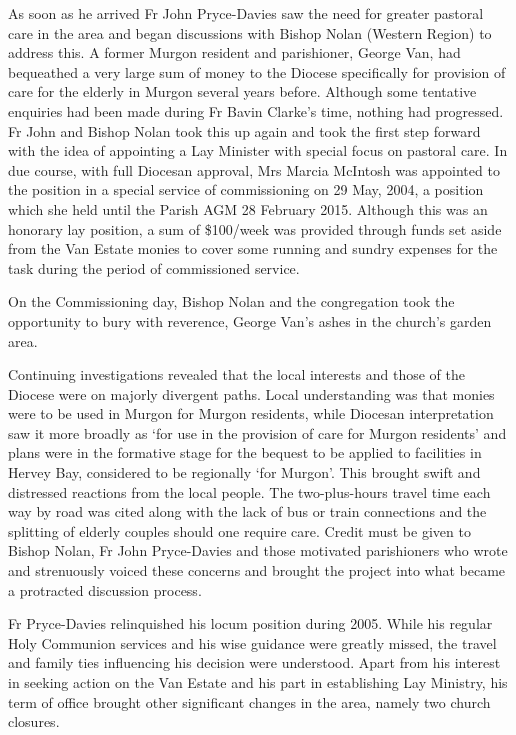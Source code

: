 As soon as he arrived Fr John Pryce-Davies saw the need for greater pastoral care in the area and began discussions with Bishop Nolan (Western Region) to address this. A former Murgon resident and parishioner, George Van, had bequeathed a very large sum of money to the Diocese specifically for provision of care for the elderly in Murgon several years before. Although some tentative enquiries had been made during Fr Bavin Clarke's time, nothing had progressed. Fr John and Bishop Nolan took this up again and took the first step forward with the idea of appointing a Lay Minister with special focus on pastoral care. In due course, with full Diocesan approval, Mrs Marcia McIntosh was appointed to the position in a special service of commissioning on 29 May, 2004, a position which she held until the Parish AGM 28 February 2015. Although this was an honorary lay position, a sum of \$100/week was provided through funds set aside from the Van Estate monies to cover some running and sundry expenses for the task during the period of commissioned service.

On the Commissioning day, Bishop Nolan and the congregation took the opportunity to bury with reverence, George Van's ashes in the church's garden area.

Continuing investigations revealed that the local interests and those of the Diocese were on majorly divergent paths. Local understanding was that monies were to be used in Murgon for Murgon residents, while Diocesan interpretation saw it more broadly as `for use in the provision of care for Murgon residents' and plans were in the formative stage for the bequest to be applied to facilities in Hervey Bay, considered to be regionally `for Murgon'. This brought swift and distressed reactions from the local people. The two-plus-hours travel time each way by road was cited along with the lack of bus or train connections and the splitting of elderly couples should one require care. Credit must be given to Bishop Nolan, Fr John Pryce-Davies and those motivated parishioners who wrote and strenuously voiced these concerns and brought the project into what became a protracted discussion process.

Fr Pryce-Davies relinquished his locum position during 2005. While his regular Holy Communion services and his wise guidance were greatly missed, the travel and family ties influencing his decision were understood. Apart from his interest in seeking action on the Van Estate and his part in establishing Lay Ministry, his term of office brought other significant changes in the area, namely two church closures.

